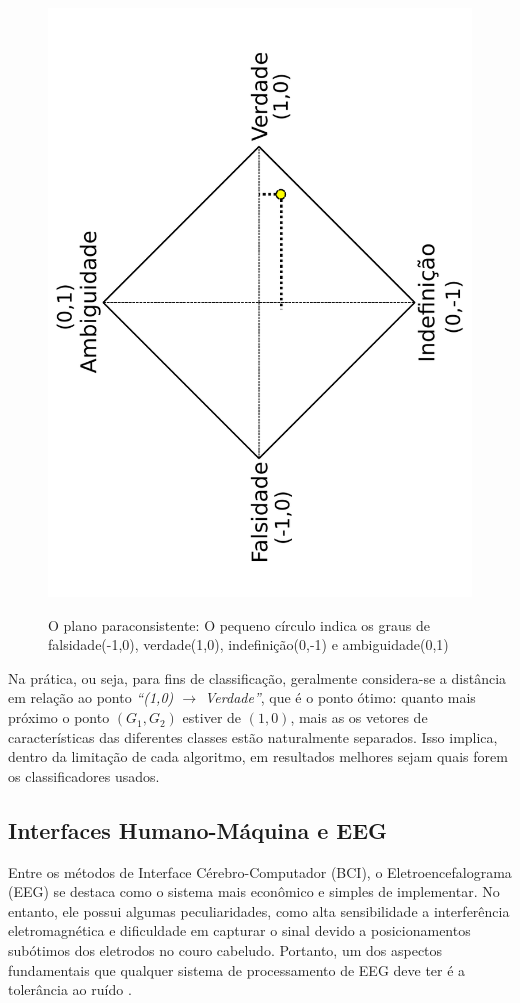 			\begin{figure}[H]
				\centering
				\caption[O plano paraconsistente]{O plano paraconsistente: O pequeno círculo indica os graus de falsidade(-1,0), verdade(1,0), indefinição(0,-1) e ambiguidade(0,1)}
				\includegraphics[angle=-90, width=0.69\linewidth]{images/paraconsistentPlane.pdf}
				\label{fig:paraconsistentplane}
			\end{figure}
			\par Na prática, ou seja, para fins de classificação, geralmente considera-se a distância em relação ao ponto \textit{``(1,0) $\rightarrow$ Verdade''}, que é o ponto ótimo: quanto mais próximo o ponto $(G_1,G_2)$ estiver de $(1,0)$, mais as os vetores de características das diferentes classes estão naturalmente separados. Isso implica, dentro da limitação de cada algoritmo, em resultados melhores sejam quais forem os classificadores usados.
	
		\subsection{Interfaces Humano-Máquina e EEG}
			
			\par Entre os métodos de Interface Cérebro-Computador (BCI), o Eletroencefalograma (EEG) se destaca como o sistema mais econômico e simples de implementar. No entanto, ele possui algumas peculiaridades, como alta sensibilidade a interferência eletromagnética e dificuldade em capturar o sinal devido a posicionamentos subótimos dos eletrodos no couro cabeludo. Portanto, um dos aspectos fundamentais que qualquer sistema de processamento de EEG deve ter é a tolerância ao ruído \cite{JALALYBIDGOLY2020101788}.
			
